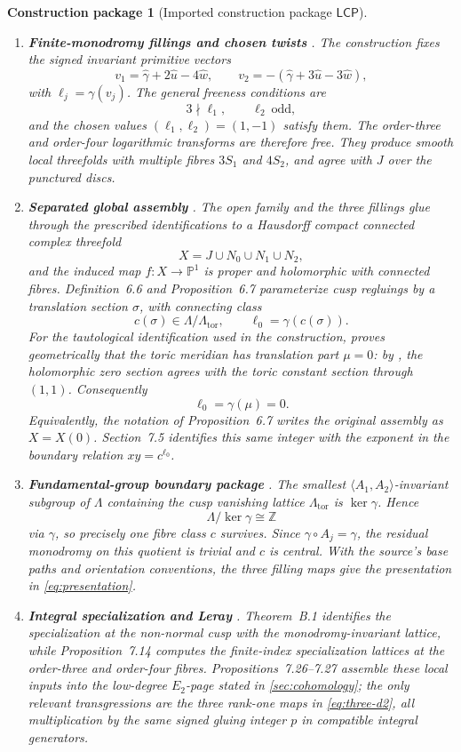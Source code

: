 \documentclass[11pt,reqno]{amsart}
\numberwithin{equation}{section}
\newcommand{\Z}{\mathbb Z}
\newcommand{\Pone}{\mathbb P^1}
\newcommand{\wideg}{\widehat\gamma}
\newcommand{\wideu}{\widehat u}
\newcommand{\widew}{\widehat w}
\newcommand{\LambdaTor}{\Lambda_{\mathrm{tor}}}
\newcommand{\LCP}{\mathsf{LCP}}
\newtheorem{construction}[construction]{Construction package}
\theoremstyle{definition}
\begin{document}
\begin{construction}[Imported construction package $\LCP$]
\begin{enumerate}[label=\textup{(L\arabic*)}]
\item \textbf{Finite-monodromy fillings and chosen twists} \cite[Def.~5.3, Thm.~5.4]{S6}. The construction fixes the signed invariant primitive vectors
\[
 v_1=\wideg+2\wideu-4\widew,
 \qquad
 v_2=-(\wideg+3\wideu-3\widew),
\]
with $\ell_j=\gamma(v_j)$. The general freeness conditions are
\[
3\nmid\ell_1,
\qquad
\ell_2\ \text{odd},
\]
and the chosen values $(\ell_1,\ell_2)=(1,-1)$ satisfy them. The order-three and order-four logarithmic transforms are therefore free. They produce smooth local threefolds with multiple fibres $3S_1$ and $4S_2$, and agree with $J$ over the punctured discs.

\item \textbf{Separated global assembly} \cite[Thm.~6.2, Prop.~6.3]{S6}. The open family and the three fillings glue through the prescribed identifications to a Hausdorff compact connected complex threefold
\[
 X=J\cup N_0\cup N_1\cup N_2,
\]
and the induced map $f:X\to\Pone$ is proper and holomorphic with connected fibres. Definition~6.6 and Proposition~6.7 parameterize cusp regluings by a translation section $\sigma$, with connecting class
\[
 c(\sigma)\in\Lambda/\LambdaTor,
 \qquad
 \ell_0=\gamma(c(\sigma)).
\]
For the tautological identification used in the construction, \cite[\S7.5]{S6} proves geometrically that the toric meridian has translation part $\mu=0$: by \cite[Prop.~4.7(iv), Lem.~6.5(i)]{S6}, the holomorphic zero section agrees with the toric constant section through $(1,1)$. Consequently
\[
\ell_0=\gamma(\mu)=0.
\]
Equivalently, the notation of Proposition~6.7 writes the original assembly as $X=X(0)$. Section~7.5 identifies this same integer with the exponent in the boundary relation $xy=c^{\ell_0}$.

\item \textbf{Fundamental-group boundary package} \cite[Lem.~2.7(iii)--(iv), Lem.~7.4, Lem.~7.16, Thm.~7.17]{S6}. The smallest $\langle A_1,A_2\rangle$-invariant subgroup of $\Lambda$ containing the cusp vanishing lattice $\LambdaTor$ is $\ker\gamma$. Hence
\[
\Lambda/\ker\gamma\cong\Z
\]
via $\gamma$, so precisely one fibre class $c$ survives. Since $\gamma\circ A_j=\gamma$, the residual monodromy on this quotient is trivial and $c$ is central. With the source's base paths and orientation conventions, the three filling maps give the presentation in \cref{eq:presentation}.

\item \textbf{Integral specialization and Leray} \cite[Thm.~B.1, Prop.~7.14, Props.~7.26--7.27]{S6}. Theorem~B.1 identifies the specialization at the non-normal cusp with the monodromy-invariant lattice, while Proposition~7.14 computes the finite-index specialization lattices at the order-three and order-four fibres. Propositions~7.26--7.27 assemble these local inputs into the low-degree $E_2$-page stated in \cref{sec:cohomology}; the only relevant transgressions are the three rank-one maps in \cref{eq:three-d2}, all multiplication by the same signed gluing integer $p$ in compatible integral generators.
\end{enumerate}
\end{construction}
\end{document}

